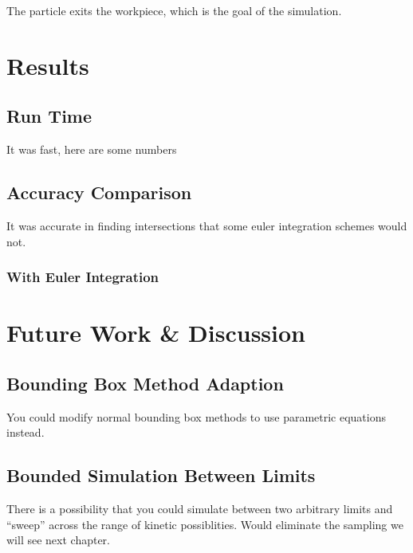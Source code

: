 		The particle exits the workpiece, which is the goal of the simulation.

\section{Results}

	\subsection{Run Time}

	It was fast, here are some numbers

	\subsection{Accuracy Comparison}

	It was accurate in finding intersections that some euler integration schemes would not.

		\subsubsection{With Euler Integration}

\section{Future Work \& Discussion}

	\subsection{Bounding Box Method Adaption}

	You could modify normal bounding box methods to use parametric equations instead.

	\subsection{Bounded Simulation Between Limits}

	There is a possibility that you could simulate between two arbitrary limits and ``sweep'' across the range of kinetic possiblities. Would eliminate the sampling we will see next chapter.

